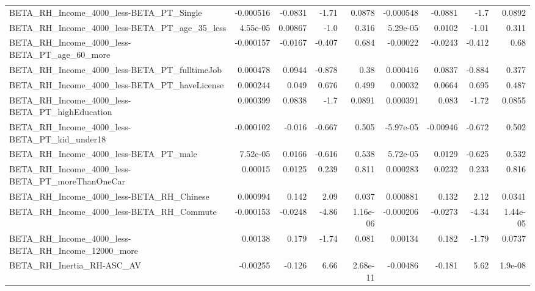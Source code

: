 \begin{tabular}{lrrrrrrrr}
BETA\_RH\_Income\_4000\_less-BETA\_PT\_Single            &   -0.000516 &      -0.0831 &    -1.71 &   0.0878 &  -0.000548 &     -0.0881 &         -1.7 &        0.0892 \\
BETA\_RH\_Income\_4000\_less-BETA\_PT\_age\_35\_less       &    4.55e-05 &      0.00867 &     -1.0 &    0.316 &   5.29e-05 &      0.0102 &        -1.01 &         0.311 \\
BETA\_RH\_Income\_4000\_less-BETA\_PT\_age\_60\_more       &   -0.000157 &      -0.0167 &   -0.407 &    0.684 &   -0.00022 &     -0.0243 &       -0.412 &          0.68 \\
BETA\_RH\_Income\_4000\_less-BETA\_PT\_fulltimeJob       &    0.000478 &       0.0944 &   -0.878 &     0.38 &   0.000416 &      0.0837 &       -0.884 &         0.377 \\
BETA\_RH\_Income\_4000\_less-BETA\_PT\_haveLicense       &    0.000244 &        0.049 &    0.676 &    0.499 &    0.00032 &      0.0664 &        0.695 &         0.487 \\
BETA\_RH\_Income\_4000\_less-BETA\_PT\_highEducation     &    0.000399 &       0.0838 &     -1.7 &   0.0891 &   0.000391 &       0.083 &        -1.72 &        0.0855 \\
BETA\_RH\_Income\_4000\_less-BETA\_PT\_kid\_under18       &   -0.000102 &       -0.016 &   -0.667 &    0.505 &  -5.97e-05 &    -0.00946 &       -0.672 &         0.502 \\
BETA\_RH\_Income\_4000\_less-BETA\_PT\_male              &    7.52e-05 &       0.0166 &   -0.616 &    0.538 &   5.72e-05 &      0.0129 &       -0.625 &         0.532 \\
BETA\_RH\_Income\_4000\_less-BETA\_PT\_moreThanOneCar    &     0.00015 &       0.0125 &    0.239 &    0.811 &   0.000283 &      0.0232 &        0.233 &         0.816 \\
BETA\_RH\_Income\_4000\_less-BETA\_RH\_Chinese           &    0.000994 &        0.142 &     2.09 &    0.037 &   0.000881 &       0.132 &         2.12 &        0.0341 \\
BETA\_RH\_Income\_4000\_less-BETA\_RH\_Commute           &   -0.000153 &      -0.0248 &    -4.86 & 1.16e-06 &  -0.000206 &     -0.0273 &        -4.34 &      1.44e-05 \\
BETA\_RH\_Income\_4000\_less-BETA\_RH\_Income\_12000\_more &     0.00138 &        0.179 &    -1.74 &    0.081 &    0.00134 &       0.182 &        -1.79 &        0.0737 \\
BETA\_RH\_Inertia\_RH-ASC\_AV                          &    -0.00255 &       -0.126 &     6.66 & 2.68e-11 &   -0.00486 &      -0.181 &         5.62 &       1.9e-08 \\

\end{tabular}
